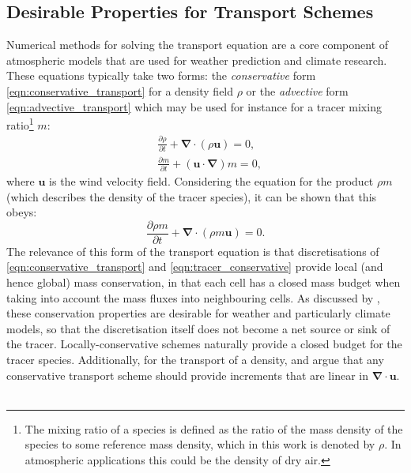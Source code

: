 \documentclass{ametsocV6.1}
\newcommand{\pfrac}[2]{\frac{\partial{#1}}{\partial{#2}}}
\begin{document}
\subsection{Desirable Properties for Transport Schemes}
Numerical methods for solving the transport equation are a core component of atmospheric models that are used for weather prediction and climate research.
These equations typically take two forms: the \textit{conservative} form \eqref{eqn:conservative_transport} for a density field $\rho$ or the \textit{advective} form \eqref{eqn:advective_transport} which may be used for instance for a tracer mixing ratio\footnote{The mixing ratio of a species is defined as the ratio of the mass density of the species to some reference mass density, which in this work is denoted by $\rho$. In atmospheric applications this could be the density of dry air.} $m$:
\begin{subequations}
\begin{align}
& \pfrac{\rho}{t} + \bm{\nabla\cdot}\left(\rho\bm{u}\right) = 0, \label{eqn:conservative_transport} \\
& \pfrac{m}{t} + \left(\bm{u\cdot\nabla}\right)m = 0, \label{eqn:advective_transport}
\end{align}
\end{subequations}
where $\bm{u}$ is the wind velocity field.
Considering the equation for the product $\rho m$ (which describes the density of the tracer species), it can be shown that this obeys:
\begin{equation}
\pfrac{\rho m}{t} + \bm{\nabla\cdot}\left(\rho m\bm{u}\right) = 0. \label{eqn:tracer_conservative}
\end{equation}
The relevance of this form of the transport equation is that discretisations of \eqref{eqn:conservative_transport} and \eqref{eqn:tracer_conservative} provide local (and hence global) mass conservation, in that each cell has a closed mass budget when taking into account the mass fluxes into neighbouring cells.
As discussed by \cite{thuburn2008some}, these conservation properties are desirable for weather and particularly climate models, so that the discretisation itself does not become a net source or sink of the tracer.
Locally-conservative schemes naturally provide a closed budget for the tracer species. 
Additionally, for the transport of a density, \citet{lin1996ffsl} and \citet{melvin2024mixed} argue that any conservative transport scheme should provide increments that are linear in $\bm{\nabla\cdot u}$. 
\\
\\
\end{document}
